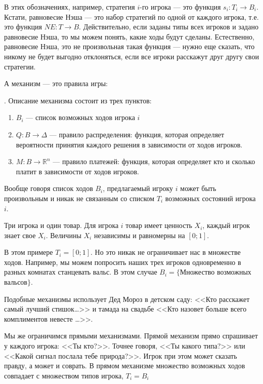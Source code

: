 В этих обозначениях, например, стратегия $ i $-го игрока --- это функция $ s_{i}:T_{i}\to B_{i} $. Кстати, равновесие Нэша --- это набор стратегий по одной от каждого игрока, т.е. это функция $ NE:T\to B $. Действительно, если заданы типы всех игроков и задано равновесие Нэша, то мы можем понять, какие ходы будут сделаны. Естественно, равновесие Нэша, это не произвольная такая функция --- нужно еще сказать, что никому не будет выгодно отклоняться, если все игроки расскажут друг другу свои стратегии.

А механизм --- это правила игры:

\begin{mydef} . Описание механизма состоит из трех пунктов:
\begin{enumerate}
\item $ B_{i} $ --- список возможных ходов игрока $ i $
\item $Q:B\to \Delta  $ --- правило распределения: функция, которая определяет вероятности принятия каждого решения в зависимости от ходов игроков.
\item $M:B\to \mathbb{R}^{n}  $ --- правило платежей: функция, которая определяет кто и сколько платит в зависимости от ходов игроков. 
\end{enumerate}
\end{mydef}
 
Вообще говоря список ходов $ B_{i} $, предлагаемый игроку $ i $ может быть произвольным и никак не связанным со списком $ T_{i} $ возможных состояний игрока $ i $. 

\begin{myex}
Три игрока и один товар. Для игрока $ i $ товар имеет ценность $ X_{i} $, каждый игрок знает свое $ X_{i} $. Величины $ X_{i}  $ независимы и равномерны на $ [0;1] $.

В этом примере $ T_{i}=[0;1] $. Но это никак не ограничивает нас в множестве ходов. Например, мы можем попросить наших трех игроков одновременно в разных комнатах станцевать вальс. В этом случае $B_{i} =\{ $Множество возможных вальсов$\}$.
\end{myex}

Подобные механизмы использует Дед Мороз в детском саду: <<Кто расскажет самый лучший стишок\ldots>> и тамада на свадьбе <<Кто назовет больше всего комплиментов невесте \ldots>>.

Мы же ограничимся прямыми механизмами. Прямой механизм прямо спрашивает у каждого игрока: <<Ты кто?>>. Точнее говоря, <<Ты какого типа?>> или <<Какой сигнал послала тебе природа?>>. Игрок при этом может сказать правду, а может и соврать. В прямом механизме множество возможных ходов совпадает с множеством типов игрока, $ T_{i}=B_{i} $

